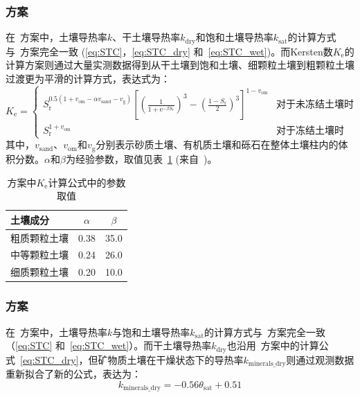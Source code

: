 \subsubsection{\citet{balland2005}方案}
在~\citet{balland2005}方案中，土壤导热率$k$、干土壤导热率$k_{\mathrm{dry}}$和饱和土壤导热率$k_{\mathrm{sat}}$的计算方式与~\citet{Johansen1975}方案完全一致 (\eqref{eq:STC}，\eqref{eq:STC_dry} 和~\eqref{eq:STC_wet})。而Kersten数$K_{\mathrm {e}} $的计算方案则通过大量实测数据得到从干土壤到饱和土壤、细颗粒土壤到粗颗粒土壤过渡更为平滑的计算方式，表达式为：
\begin{equation}
  K_{\mathrm {e}} =\begin{cases}
    S_{\mathrm {r}} ^{0.5(1+v_{\mathrm{om}}-\alpha v_{\mathrm{sand}}-v_{\mathrm {g}} )}\left[\left(\frac{1}{1+{\mathrm e}^{-\beta S_{\mathrm {r}} }}\right)^3-\left(\frac{1-S_{\mathrm {r}} }{2}\right)^3\right]^{1-v_{\mathrm{om}}} & \text {对于未冻结土壤时} \\
    S_{\mathrm {r}} ^{1+v_{\mathrm{om}}} & \text {对于冻结土壤时}
  \end{cases}
\end{equation}
其中，$v_{\mathrm{sand}}$、$v_{\mathrm{om}}$和$v_{\mathrm {g}} $分别表示砂质土壤、有机质土壤和砾石在整体土壤柱内的体积分数。$\alpha$和$\beta$为经验参数，取值见表~\ref{tab:Balland-Arp方案中Ke计算参数取值} (来自~\citet{Barry2015thermal})。

{
  \begin{table}[htbp]
    \centering
    \caption{\citet{balland2005}方案中$K_{\mathrm {e}} $计算公式中的参数取值}
    \label{tab:Balland-Arp方案中Ke计算参数取值}
    \begin{tabular}{@{}lcc@{}}
      \toprule
      土壤成分     & $\alpha$ & $\beta$ \\
      \midrule
      粗质颗粒土壤 & 0.38     & 35.0    \\
      中等颗粒土壤 & 0.24     & 26.0    \\
      细质颗粒土壤 & 0.20     & 10.0    \\
      \bottomrule
    \end{tabular}
  \end{table}
}


\subsubsection{\citet{lu2007improved}方案}
在~\citet{lu2007improved}方案中，土壤导热率$k$与饱和土壤导热率$k_{\mathrm{sat}}$的计算方式与~\citet{Johansen1975}方案完全一致（\eqref{eq:STC} 和~\eqref{eq:STC_wet}）。而干土壤导热率$k_{\mathrm{dry}}$也沿用~\citet{Johansen1975}方案中的计算公式~\eqref{eq:STC_dry}，但矿物质土壤在干燥状态下的导热率$k_{\mathrm{minerals\_dry}}$则通过观测数据重新拟合了新的公式，表达为：
\begin{equation}\label{eq:STC_dry_Lu}
  k_{\mathrm{minerals\_dry}}=-0.56\theta_{\mathrm {sat}} +0.51
\end{equation}

